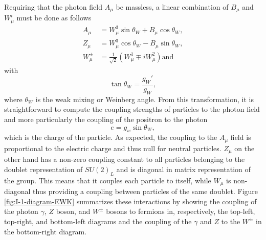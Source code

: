     Requiring that the photon field $ A_\mu $ be massless, a linear combination of $ B_\mu $ and $ W^i_\mu $ must be done as follows
    \begin{align}
      A_\mu & = W^3_\mu \sin \theta_W + B_\mu \cos \theta_W , \\
      Z_\mu & = W^3_\mu \cos \theta_W - B_\mu \sin \theta_W , \\
      W^\pm_\mu & = \frac{1}{\sqrt{2}} \left( W^1_\mu \mp i W^2_\mu \right) \text{and}
    \end{align}
    with
    \begin{equation}
      \tan \theta_W = \frac{g_W'}{g_W} ,
    \end{equation}
    where $ \theta_W $ is the weak mixing or Weinberg angle. From this transformation, it is straightforward to compute the coupling strengths of particles to the photon field and more particularly the coupling of the positron to the photon
    \begin{equation}
      e = g_w \sin \theta_W ,
    \end{equation}
    which is the charge of the particle. As expected, the coupling to the $ A_\mu $ field is proportional to the electric charge and thus null for neutral particles. $ Z_\mu $ on the other hand has a non-zero coupling constant to all particles belonging to the doublet representation of $ SU(2)_L $ and is diagonal in matrix representation of the group. This means that it couples each particle to itself, while $ W_\mu $ is non-diagonal thus providing a coupling between particles of the same doublet. Figure \ref{fig:I-1-diagram-EWK} summarizes these interactions by showing the coupling of the photon $ \gamma $, $ Z $ boson, and $ W^\pm $ bosons to fermions in, respectively, the top-left, top-right, and bottom-left diagrams and the coupling of the $ \gamma $ and $ Z $ to the $ W^\pm $ in the bottom-right diagram.

